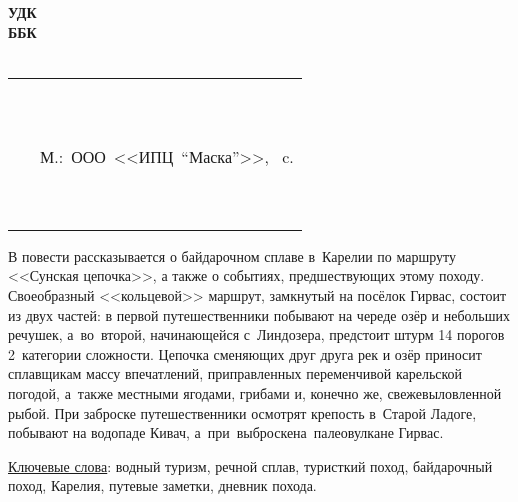 {
\thispagestyle{empty}
%
\small{
\begin{flushleft}
\textbf{%
	УДК \UDK \\
	ББК \BBK \\
	\BibCode \\
}
\end{flushleft}
%
\vspace{1cm}
%
\begin{flushright}
{
\begin{tabular}[c]{>{\raggedright}m{14mm} >{\raggedright}m{95mm} }
	\textbf{\BibCode} & \MyVarAuthorName \tabularnewline
	~ & \MyVarBookName \tabularnewline
	~ & \MyVarBookNamesec \tabularnewline
	~ & М.:~ООО~<<ИПЦ~"`Маска"'>>,~\year\mdash \pageref{LastPage} c. \tabularnewline	
	~ & \textbf{\ISBN} \tabularnewline
	~ & \ciao{16+}
\end{tabular}
}
\end{flushright}
%
\vspace{0.5cm}
\hspace{1.0cm} В повести рассказывается о байдарочном сплаве в~Карелии по маршруту <<Сунская цепочка>>\cite{Шилов}, а также о событиях, предшествующих этому походу. Своеобразный <<кольцевой>> маршрут, замкнутый на посёлок Гирвас, состоит из двух частей: в первой путешественники побывают на череде озёр и небольших речушек, а~во~второй, начинающейся с~Линдозера, предстоит штурм 14 порогов 2~категории сложности. Цепочка сменяющих друг друга рек и озёр приносит сплавщикам массу впечатлений, приправленных переменчивой карельской погодой, а~также местными ягодами, грибами и, конечно же, свежевыловленной рыбой. При заброске путешественники осмотрят крепость в~Старой Ладоге, побывают на водопаде Кивач, а~при~выброске\mdash на~палеовулкане Гирвас.

\vspace{4mm}
\noindent \underline{Ключевые слова}: водный туризм, речной сплав, туристкий поход, байдарочный поход, Карелия, путевые заметки, дневник похода.
%
%
\vspace{4mm}
%

\noindent\makebox[\textwidth][s]{\textbf{\ISBN}\hfill{\copyright~\MyVarAuthorName,~\year}}
}

}
